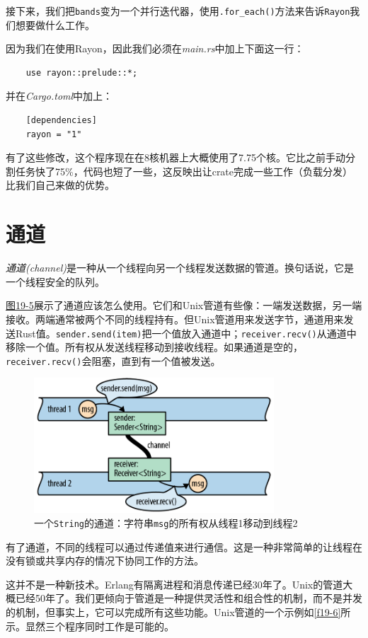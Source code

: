 接下来，我们把\texttt{bands}变为一个并行迭代器，使用\texttt{.for\_each()}方法来告诉\texttt{Rayon}我们想要做什么工作。

因为我们在使用Rayon，因此我们必须在\emph{main.rs}中加上下面这一行：
\begin{verbatim}
    use rayon::prelude::*;
\end{verbatim}
并在\emph{Cargo.toml}中加上：
\begin{verbatim}
    [dependencies]
    rayon = "1"
\end{verbatim}

有了这些修改，这个程序现在在8核机器上大概使用了7.75个核。它比之前手动分割任务快了75\%，代码也短了一些，这反映出让crate完成一些工作（负载分发）比我们自己来做的优势。

\section{通道}
\emph{通道(channel)}是一种从一个线程向另一个线程发送数据的管道。换句话说，它是一个线程安全的队列。

\hyperref[f19-5]{图19-5}展示了通道应该怎么使用。它们和Unix管道有些像：一端发送数据，另一端接收。两端通常被两个不同的线程持有。但Unix管道用来发送字节，通道用来发送Rust值。\texttt{sender.send(item)}把一个值放入通道中；\texttt{receiver.recv()}从通道中移除一个值。所有权从发送线程移动到接收线程。如果通道是空的，\texttt{receiver.recv()}会阻塞，直到有一个值被发送。

\begin{figure}[htbp]
    \centering
    \includegraphics[width=0.8\textwidth]{../img/f19-5.png}
    \caption{一个\texttt{String}的通道：字符串\texttt{msg}的所有权从线程1移动到线程2}
    \label{f19-5}
\end{figure}

有了通道，不同的线程可以通过传递值来进行通信。这是一种非常简单的让线程在没有锁或共享内存的情况下协同工作的方法。

这并不是一种新技术。Erlang有隔离进程和消息传递已经30年了。Unix的管道大概已经50年了。我们更倾向于管道是一种提供灵活性和组合性的机制，而不是并发的机制，但事实上，它可以完成所有这些功能。Unix管道的一个示例如\autoref{f19-6}所示。显然三个程序同时工作是可能的。

